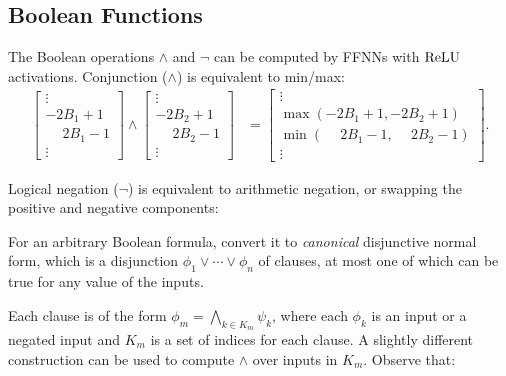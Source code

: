     \subsection{Boolean Functions}
    The Boolean operations $\land$ and $\lnot$ can be computed by FFNNs with $\text{ReLU}$ activations. Conjunction ($\land$) is equivalent to min/max:
  \begin{align*}
  \begin{bmatrix} \vdots \\ -2B_1+1 \\ \phantom{-}2B_1-1 \\ \vdots \end{bmatrix} \land \begin{bmatrix} \vdots \\ -2B_2+1 \\ \phantom{-}2B_2-1 \\ \vdots \end{bmatrix} &= \begin{bmatrix} \vdots \\ \max(-2B_1+1,-2B_2+1) \\ \min(\phantom{-}2B_1-1,\phantom{-}2B_2-1) \\ \vdots \end{bmatrix}.
  \end{align*}

  Logical negation ($\lnot$) is equivalent to arithmetic negation, or swapping the positive and negative components:
  \begin{center}
  \end{center}

    For an arbitrary Boolean formula, convert it to \emph{canonical} disjunctive normal form, which is a disjunction $\phi_1 \lor \cdots \lor \phi_n$ of clauses, at most one of which can be true for any value of the inputs. 

    Each clause is of the form $\phi_m = \bigwedge_{k\in K_m} \psi_k$, where each $\phi_k$ is an input or a negated input and $K_m$ is a set of indices for each clause. A slightly different construction can be used to compute $\land$ over inputs in $K_m$. Observe that:

